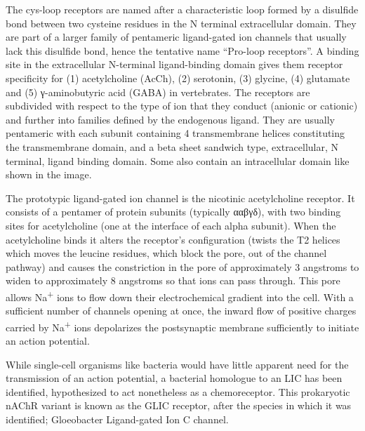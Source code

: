 The cys-loop receptors are named after a characteristic loop formed by a disulfide bond between two cysteine residues in the N terminal extracellular domain. They are part of a larger family of pentameric ligand-gated ion channels that usually lack this disulfide bond, hence the tentative name ``Pro-loop receptors''. A binding site in the extracellular N-terminal ligand-binding domain gives them receptor specificity for (1) acetylcholine (AcCh), (2) serotonin, (3) glycine, (4) glutamate and (5) γ-aminobutyric acid (GABA) in vertebrates. The receptors are subdivided with respect to the type of ion that they conduct (anionic or cationic) and further into families defined by the endogenous ligand. They are usually pentameric with each subunit containing 4 transmembrane helices constituting the transmembrane domain, and a beta sheet sandwich type, extracellular, N terminal, ligand binding domain. Some also contain an intracellular domain like shown in the image.

The prototypic ligand-gated ion channel is the nicotinic acetylcholine receptor. It consists of a pentamer of protein subunits (typically ααβγδ), with two binding sites for acetylcholine (one at the interface of each alpha subunit). When the acetylcholine binds it alters the receptor's configuration (twists the T2 helices which moves the leucine residues, which block the pore, out of the channel pathway) and causes the constriction in the pore of approximately 3 angstroms to widen to approximately 8 angstroms so that ions can pass through. This pore allows Na\textsuperscript{+} ions to flow down their electrochemical gradient into the cell. With a sufficient number of channels opening at once, the inward flow of positive charges carried by Na\textsuperscript{+} ions depolarizes the postsynaptic membrane sufficiently to initiate an action potential.

While single-cell organisms like bacteria would have little apparent need for the transmission of an action potential, a bacterial homologue to an LIC has been identified, hypothesized to act nonetheless as a chemoreceptor. This prokaryotic nAChR variant is known as the GLIC receptor, after the species in which it was identified; Gloeobacter Ligand-gated Ion C channel.

